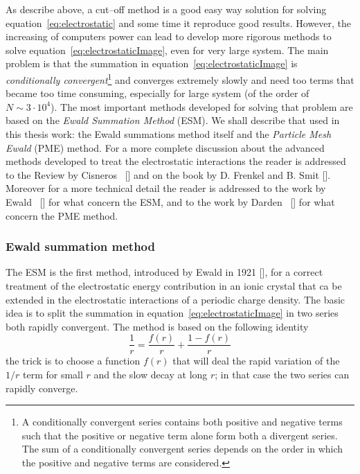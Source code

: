 As describe above, a cut--off method is a good easy way solution for solving equation~\eqref{eq:electrostatic} and some time it reproduce good results. However, the increasing of computers power can lead to develop more rigorous methods to solve equation~\eqref{eq:electrostaticImage}, even for very large system. The main problem is that the summation in equation~\eqref{eq:electrostaticImage} is \textit{conditionally convergent}\footnote{A conditionally convergent series contains both positive and negative terms such that the positive or negative term alone form both a divergent series. The sum of a conditionally convergent series depends on the order in which the positive and negative terms are considered.} and converges extremely slowly and need too terms that became too time consuming, especially for large system (of the order of $N \sim 3\cdot 10^4$). The most important methods developed for solving that problem are based on the \textit{Ewald Summation Method} (\acs{ESM}). We shall describe that used in this thesis work: the Ewald summations method itself and the \textit{Particle Mesh Ewald} (\acs{PME}) method. For a more complete discussion about the advanced methods developed to treat the electrostatic interactions the reader is addressed to the Review by Cisneros \etal\, [] and on the book by D. Frenkel and B. Smit []. Moreover for a more technical detail the reader is addressed to the work by Ewald \etal\, [] for what concern the \ac{ESM}, and to the work by Darden \etal\, [] for what concern the \ac{PME} method.

\subsubsection{Ewald summation method} %
The \acf{ESM} is the first method, introduced by Ewald in 1921 [], for a correct treatment of the electrostatic energy contribution in an ionic crystal that ca be extended in the electrostatic interactions of a periodic charge density. The basic idea is to split the summation in equation~\eqref{eq:electrostaticImage} in two series both rapidly convergent. The method is based on the following identity
\begin{equation}
	\frac{1}{r} = \frac{f(r)}{r} + \frac{1 - f(r)}{r}
	\label{eq:ewaldTrick}
\end{equation}
the trick is to choose a function $f(r)$ that will deal the rapid variation of the $1/r$ term for small $r$ and the slow decay at long $r$; in that case the two series can rapidly converge.

